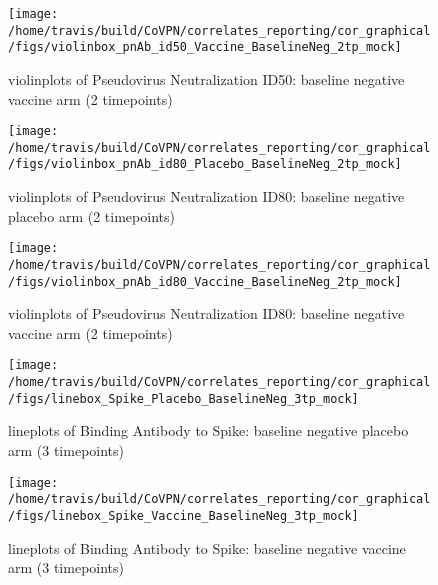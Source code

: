 \documentclass[]{book}
\theoremstyle{definition}
\theoremstyle{definition}
\theoremstyle{definition}
\newcommand{\1}{\mathbbm{1}}
\begin{document}
\clearpage
\begin{figure}[H]

{\centering \texttt{[image: /home/travis/build/CoVPN/correlates\_reporting/cor\_graphical/figs/violinbox\_pnAb\_id50\_Vaccine\_BaselineNeg\_2tp\_mock]} 

}

\caption{violinplots of Pseudovirus Neutralization ID50: baseline negative vaccine arm (2 timepoints)}\label{fig:unnamed-chunk-40}
\end{figure}

\clearpage
\begin{figure}[H]

{\centering \texttt{[image: /home/travis/build/CoVPN/correlates\_reporting/cor\_graphical/figs/violinbox\_pnAb\_id80\_Placebo\_BaselineNeg\_2tp\_mock]} 

}

\caption{violinplots of Pseudovirus Neutralization ID80: baseline negative placebo arm (2 timepoints)}\label{fig:unnamed-chunk-41}
\end{figure}

\clearpage
\begin{figure}[H]

{\centering \texttt{[image: /home/travis/build/CoVPN/correlates\_reporting/cor\_graphical/figs/violinbox\_pnAb\_id80\_Vaccine\_BaselineNeg\_2tp\_mock]} 

}

\caption{violinplots of Pseudovirus Neutralization ID80: baseline negative vaccine arm (2 timepoints)}\label{fig:unnamed-chunk-42}
\end{figure}

\clearpage
\begin{figure}[H]

{\centering \texttt{[image: /home/travis/build/CoVPN/correlates\_reporting/cor\_graphical/figs/linebox\_Spike\_Placebo\_BaselineNeg\_3tp\_mock]} 

}

\caption{lineplots of Binding Antibody to Spike: baseline negative placebo arm (3 timepoints)}\label{fig:unnamed-chunk-43}
\end{figure}

\clearpage
\begin{figure}[H]

{\centering \texttt{[image: /home/travis/build/CoVPN/correlates\_reporting/cor\_graphical/figs/linebox\_Spike\_Vaccine\_BaselineNeg\_3tp\_mock]} 

}

\caption{lineplots of Binding Antibody to Spike: baseline negative vaccine arm (3 timepoints)}\label{fig:unnamed-chunk-44}
\end{figure}
\end{document}
